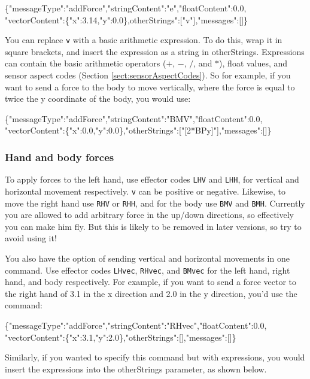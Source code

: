 \begin{center}
\scriptsize{\{"messageType":"addForce","stringContent":"e","floatContent":0.0,
	"vectorContent":\{"x":3.14,"y":0.0\},otherStrings":["v"],"messages":[]\}}
\end{center}

You can replace \texttt{v} with a basic arithmetic expression. To do this, wrap it in square brackets, and insert the expression as a string in otherStrings. Expressions can contain the basic arithmetic operators ($+$, $-$, $/$, and $*$), float values, and sensor aspect codes (Section \ref{sect:sensorAspectCodes}). So for example, if you want to send a force to the body to move vertically, where the force is equal to twice the y coordinate of the body, you would use:

\begin{center}
\scriptsize{\{"messageType":"addForce","stringContent":"BMV","floatContent":0.0, "vectorContent":\{"x":0.0,"y":0.0\},"otherStrings":["[2*BPy]"],"messages":[]\}}
\end{center}

\subsubsection{Hand and body forces}

To apply forces to the left hand, use effector codes \texttt{LHV} and \texttt{LHH}, for vertical and horizontal movement respectively. \texttt{v} can be positive or negative. Likewise, to move the right hand use \texttt{RHV} or \texttt{RHH}, and for the body use \texttt{BMV} and \texttt{BMH}. Currently you are allowed to add arbitrary force in the up/down directions, so effectively you can make him fly. But this is likely to be removed in later versions, so try to avoid using it!

You also have the option of sending vertical and horizontal movements in one command. Use effector codes \texttt{LHvec}, \texttt{RHvec}, and \texttt{BMvec} for the left hand, right hand, and body respectively. For example, if you want to send a force vector to the right hand of 3.1 in the x direction and 2.0 in the y direction, you'd use the command:

\begin{center}
\scriptsize{\{"messageType":"addForce","stringContent":"RHvec","floatContent":0.0,  "vectorContent":\{"x":3.1,"y":2.0\},"otherStrings":[],"messages":[]\}}
\end{center}

Similarly, if you wanted to specify this command but with expressions, you would insert the expressions into the otherStrings parameter, as shown below. 

